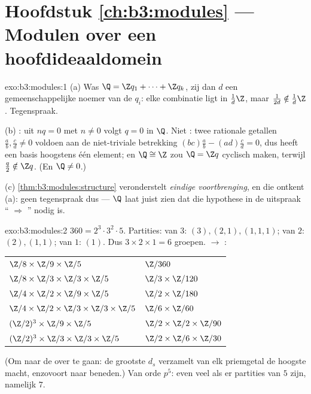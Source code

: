 \section*{Hoofdstuk \ref{ch:b3:modules} --- Modulen over een
hoofdideaaldomein}

\begin{solution}{exo:b3:modules:1}
(a) Was $\Q = \Z q_1 + \dots + \Z q_k$, zij dan $d$ een
gemeenschappelijke noemer van de $q_i$: elke combinatie ligt in
$\frac1d\Z$, maar $\frac1{2d} \notin \frac1d\Z$. Tegenspraak.

(b) : uit $nq = 0$ met $n \neq 0$ volgt $q = 0$ in $\Q$.
Niet : twee rationale getallen $\frac ab, \frac cd \neq 0$
voldoen aan de niet-triviale betrekking $(bc)\frac ab - (ad)\frac
cd = 0$, dus heeft een basis hoogstens één element; en $\Q \cong
\Z$ zou $\Q = \Z q$ cyclisch maken, terwijl $\frac q2 \notin \Z q$.
(En $\Q \neq 0$.)

(c) \cref{thm:b3:modules:structure} veronderstelt \emph{eindige
voortbrenging}, en die ontkent (a): geen tegenspraak dus ---
$\Q$ laat juist zien dat die hypothese in de uitspraak
`` $\Rightarrow$ '' nodig is.
\end{solution}

\begin{solution}{exo:b3:modules:2}
$360 = 2^3\cdot3^2\cdot5$. Partities: van $3$: $(3), (2,1),
(1,1,1)$; van $2$: $(2), (1,1)$; van $1$: $(1)$. Dus $3 \times 2
\times 1 = 6$ groepen.  $\to$ :
\begin{center}
\begin{tabular}{l l}
$\Z/8 \times \Z/9 \times \Z/5$ & $\Z/360$\\
$\Z/8 \times \Z/3 \times \Z/3 \times \Z/5$ & $\Z/3 \times
\Z/120$\\
$\Z/4 \times \Z/2 \times \Z/9 \times \Z/5$ & $\Z/2 \times
\Z/180$\\
$\Z/4 \times \Z/2 \times \Z/3 \times \Z/3 \times \Z/5$ & $\Z/6
\times \Z/60$\\
$(\Z/2)^3 \times \Z/9 \times \Z/5$ & $\Z/2 \times \Z/2 \times
\Z/90$\\
$(\Z/2)^3 \times \Z/3 \times \Z/3 \times \Z/5$ & $\Z/2 \times
\Z/6 \times \Z/30$
\end{tabular}
\end{center}
(Om naar de  over te gaan: de grootste $d_s$
verzamelt van elk priemgetal de hoogste macht, enzovoort naar
beneden.) Van orde $p^5$: even veel als er partities van $5$
zijn, namelijk $7$.
\end{solution}

